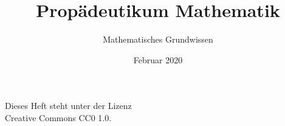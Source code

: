 \documentclass[a4paper,11pt,fleqn,twocolumn,twoside,dvipdfmx]{scrbook}
\title{Propädeutikum Mathematik}
\subtitle{Mathematisches Grundwissen}
\author{}
\date{Februar 2020}
\begin{document}
\maketitle
\clearpage

\noindent
Dieses Heft steht unter der Lizenz\\
Creative Commons CC0 1.0.

\tableofcontents




\end{document}
